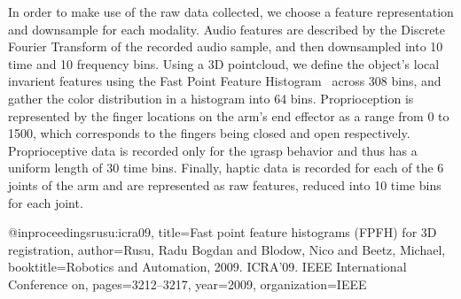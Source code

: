 

In order to make use of the raw data collected, we choose a feature representation and downsample for each modality.
Audio features are described by the Discrete Fourier Transform of the recorded audio sample, and then downsampled into 10 time and 10 frequency bins. 
Using a 3D pointcloud, we define the object's local invarient features using the Fast Point Feature Histogram~\cite{rusu:icra09}  across 308 bins, and gather the color distribution in a histogram into 64 bins.
Proprioception is represented by the finger locations on the arm's end effector as a range from 0 to 1500, which corresponds to the fingers being closed and open respectively. 
Proprioceptive data is recorded only for the \i{grasp} behavior and thus has a uniform length of 30 time bins. 
Finally, haptic data is recorded for each of the 6 joints of the arm and are represented as raw features, reduced into 10 time bins for each joint. 

@inproceedings{rusu:icra09,
  title={Fast point feature histograms (FPFH) for 3D registration},
  author={Rusu, Radu Bogdan and Blodow, Nico and Beetz, Michael},
  booktitle={Robotics and Automation, 2009. ICRA'09. IEEE International Conference on},
  pages={3212--3217},
  year={2009},
  organization={IEEE}
}
